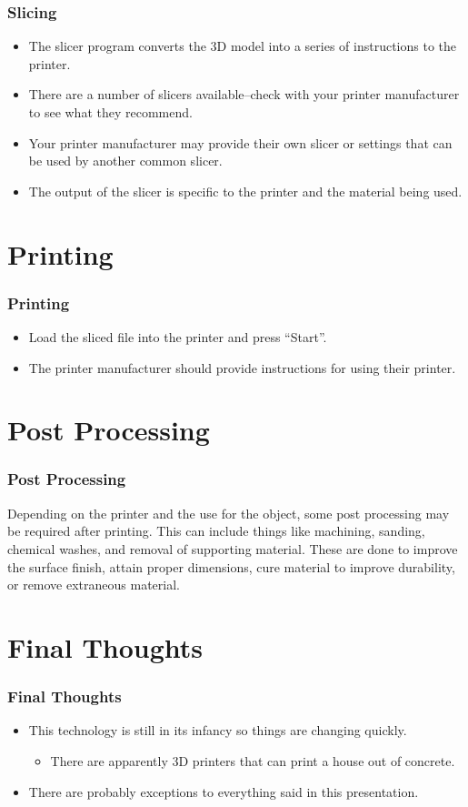 \documentclass[english,10pt]{beamer}
\begin{document}
\begin{frame}
  \frametitle{Slicing}
  \begin{itemize}
    \item The slicer program converts the 3D model into a series of instructions to the printer.
    \item There are a number of slicers available--check with your printer manufacturer to see what they recommend.
    \item Your printer manufacturer may provide their own slicer or settings that can be used by another common slicer.
    \item The output of the slicer is specific to the printer and the material being used.
  \end{itemize}
\end{frame}

\section{Printing}
\begin{frame}
  \frametitle{Printing}
  \begin{itemize}
    \item Load the sliced file into the printer and press ``Start''.
    \item The printer manufacturer should provide instructions for using their printer.
  \end{itemize}
\end{frame}

\section{Post Processing}
\begin{frame}
  \frametitle{Post Processing}
  Depending on the printer and the use for the object, some post processing may be required after printing.  This can include things like machining, sanding, chemical washes, and removal of supporting material.  These are done to improve the surface finish, attain proper dimensions, cure material to improve durability, or remove extraneous material.
\end{frame}

\section{Final Thoughts}
\begin{frame}
  \frametitle{Final Thoughts}
  \begin{itemize}
    \item This technology is still in its infancy so things are changing quickly.
    \begin{itemize}
      \item There are apparently 3D printers that can print a house out of concrete.
    \end{itemize}
    \item There are probably exceptions to everything said in this presentation.
  \end{itemize}
\end{frame}
\end{document}
